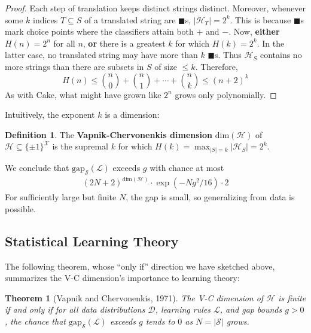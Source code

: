 \documentclass[twocolumn]{article}
\newcommand{\Dd}{\mathcal{D}}
\newcommand{\Hh}{\mathcal{H}}
\newcommand{\Ll}{\mathcal{L}}
\newcommand{\Ss}{\mathcal{S}}
\newcommand{\Xx}{\mathcal{X}}
\newcommand{\Egap}{\text{gap}_{\Ss}}
\newtheorem{thm}{Theorem}
\theoremstyle{definition}
\newtheorem{dfn}{Definition}
\begin{document}
\begin{proof}
        Each step of translation keeps distinct strings distinct.
        Moreover, whenever some $k$ indices $T\subseteq S$ of a translated string
        are $\blacksquare$s, $|\Hh_T| = 2^k$.  This is because $\blacksquare$s mark
        choice points where the classifiers attain both $+$ and $-$.
        Now, \textbf{either} $H(n)=2^n$ for all $n$, \textbf{or} there is a greatest
        $k$ for which $H(k) = 2^k$.
        In the latter case, no translated string may have more than $k$
        $\blacksquare$s.  Thus $\Hh_S$ contains no more strings than
        there are subsets in $S$ of size $\leq k$.  Therefore,
        $$
            H(n)
            \leq 
            {n\choose 0} + {n\choose 1} + \cdots + {n\choose k}
            \leq 
            (n+2)^{k}
        $$
        As with Cake, what might have grown like $2^n$ grows only
        polynomially.
    \end{proof}

    Intuitively, the exponent $k$ is a dimension: 
    \begin{dfn}
        The \textbf{Vapnik-Chervonenkis dimension} $\text{dim}(\Hh)$ of
        $\Hh \subseteq \{\pm 1\}^\Xx$ is the supremal $k$ for which $H(k) =
        \max_{|S|=k} |\Hh_S| = 2^k$.  
    \end{dfn}
    We conclude that $\Egap(\Ll)$ exceeds $g$ with chance at most
    \begin{align}
        \label{eqn:vc}
       (2N+2)^{\text{dim}(\Hh)} \cdot \exp(-Ng^2/16) \cdot 2
    \end{align}
    For sufficiently large but finite $N$, the gap is small, so
    generalizing from data is possible.

    \subsection*{Statistical Learning Theory}

        The following theorem, whose ``only if'' direction we have sketched above,
        summarizes the V-C dimension's importance to learning theory:
        \begin{thm}[Vapnik and Chervonenkis, 1971]
            The V-C dimension of $\Hh$ is finite if and only if for all data
            distributions $\Dd$, learning rules $\Ll$, and gap bounds $g>0$, the
            chance that $\Egap(\Ll)$ exceeds $g$ tends to $0$ as $N=|\Ss|$ grows.  
        \end{thm}
\end{document}
